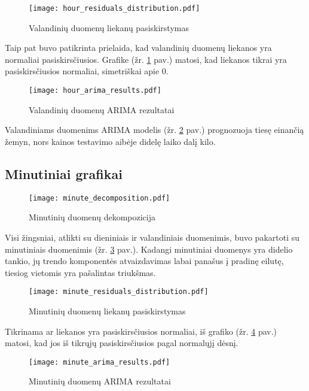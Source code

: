 \documentclass[12pt,a4paper]{article}
\begin{document}
\begin{figure}[!h]
\centering
\caption{Valandinių duomenų liekanų pasiskirstymas}
\label{hourresid}
\texttt{[image: hour\_residuals\_distribution.pdf]}
\end{figure}

Taip pat buvo patikrinta prielaida, kad valandinių duomenų liekanos yra normaliai pasiskirsčiusios. Grafike (žr. \ref{hourresid} pav.) matosi, kad liekanos tikrai yra pasiskirsčiusios normaliai, simetriškai apie 0.

\begin{figure}[!h]
\centering
\caption{Valandinių duomenų ARIMA rezultatai}
\label{hourarima}
\texttt{[image: hour\_arima\_results.pdf]}
\end{figure}

Valandiniams duomenims ARIMA modelis (žr. \ref{hourarima} pav.) prognozuoja tiesę einančią žemyn, nors kainos testavimo aibėje didelę laiko dalį kilo.
\newpage
\subsection{Minutiniai grafikai}

\begin{figure}[!h]
\centering
\caption{Minutinių duomenų dekompozicija}
\label{minutedecomp}
\texttt{[image: minute\_decomposition.pdf]}
\end{figure}

Visi žingsniai, atlikti su dieniniais ir valandiniais duomenimis, buvo pakartoti su minutiniais duomenimis (žr. \ref{minutedecomp} pav.). Kadangi minutiniai duomenys yra didelio tankio, jų trendo komponentės atvaizdavimas labai panašus į pradinę eilutę, tiesiog vietomis yra pašalintas triukšmas.

\begin{figure}[!h]
\centering
\caption{Minutinių duomenų liekanų pasiskirstymas}
\label{minuteresid}
\texttt{[image: minute\_residuals\_distribution.pdf]}
\end{figure}

Tikrinama ar liekanos yra pasiskirsčiusios
normaliai, iš grafiko (žr. \ref{minuteresid} pav.) matosi, kad jos iš tikrųjų pasiskirsčiusios pagal normalųjį dėsnį. 

\begin{figure}[!h]
\centering
\caption{Minutinių duomenų ARIMA rezultatai}
\label{minutearima}
\texttt{[image: minute\_arima\_results.pdf]}
\end{figure}
\end{document}
